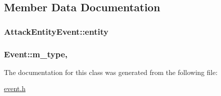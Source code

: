\subsection{Member Data Documentation}
\hypertarget{classAttackEntityEvent_a1dae8f2e2e9224c2bf5f19b665d06a8b}{
\subsubsection[{entity}]{ Attack\-Entity\-Event\-::entity}}\label{classAttackEntityEvent_a1dae8f2e2e9224c2bf5f19b665d06a8b}
\hypertarget{classEvent_a38264e3fb229dc64123dff1d5a7dcf9e}{
\subsubsection[{m\-\_\-type}]{ Event\-::m\-\_\-type\hspace{0.3cm}{\ttfamily [protected]}, {\ttfamily [inherited]}}}\label{classEvent_a38264e3fb229dc64123dff1d5a7dcf9e}


The documentation for this class was generated from the following file\-:\begin{DoxyCompactItemize}
\item 
\hyperlink{event_8h}{event.\-h}\end{DoxyCompactItemize}
